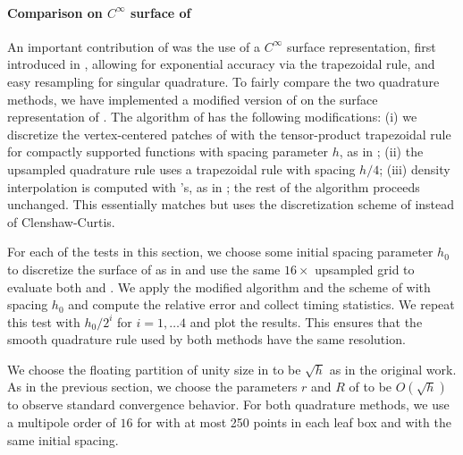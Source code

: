\paragraph{Comparison on $C^\infty$ surface of \cite{ying2004simple}}
An important contribution of \cite{YBZ} was the use of a $C^\infty$ surface representation, first introduced in \cite{ying2004simple}, allowing for exponential accuracy via the trapezoidal rule, and easy resampling for singular quadrature.
To fairly compare the two quadrature methods, we have implemented a modified version of \qbkix on the surface representation of \cite{ying2004simple}.
The algorithm of \cite[Section 3.1]{morse2020robust} has the following modifications: 
(i) we discretize the vertex-centered patches of \cite{ying2004simple} with the tensor-product trapezoidal rule for compactly supported functions with spacing parameter $h$, as in \cite{YBZ}; (ii) the upsampled quadrature rule uses a trapezoidal rule with spacing $h/4$; (iii) density interpolation is computed with \fft's, as in \cite{YBZ}; the rest of the algorithm proceeds unchanged.
This essentially matches \cite[Section 3.1]{morse2020robust} but uses the discretization scheme of \cite{YBZ} instead of Clenshaw-Curtis.

For each of the tests in this section, we choose some initial spacing parameter $h_0$ to discretize the surface of \cite{ying2004simple} as in \cite{YBZ} and use the same $16\times$ upsampled grid to evaluate both \qbkix and \cite{YBZ}.
We apply the modified \qbkix algorithm and the scheme of \cite{YBZ} with spacing $h_0$ and compute the relative error and collect timing statistics.
We repeat this test with $h_0/2^i$ for $i=1,\hdots 4$ and plot the results.
This ensures that the smooth quadrature rule used by both methods have the same resolution. 

We choose the floating partition of unity size in \cite{YBZ} to be $\sqrt{h}$ as in the original work. 
As in the previous section, we choose the parameters $r$ and $R$ of \qbkix to be $O(\sqrt{h})$ to observe standard convergence behavior.
For both quadrature methods, we use a multipole order of $16$ for \pvfmm with at most 250 points in each leaf box and with the same initial spacing.


